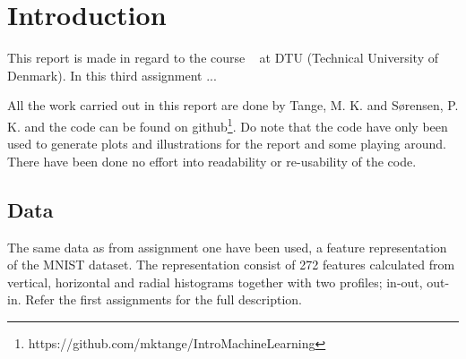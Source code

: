 \chapter{Introduction}
This report is made in regard to the course \textsf{\courseno\ \coursename} at DTU (Technical University of Denmark). In this third assignment ...


All the work carried out in this report are done by Tange, M. K. and Sørensen, P. K. and the code can be found on github\footnote{https://github.com/mktange/IntroMachineLearning}. Do note that the code have only been used to generate plots and illustrations for the report and some playing around. There have been done no effort into readability or re-usability of the code.

\section{Data}
The same data as from assignment one have been used, a feature representation of the MNIST dataset. The representation consist of 272 features calculated from vertical, horizontal and radial histograms together with two profiles; in-out, out-in. Refer the first assignments for the full description. 

